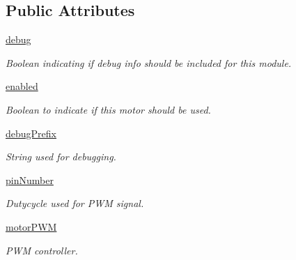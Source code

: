 \subsection*{Public Attributes}
\begin{DoxyCompactItemize}
\item 
\mbox{\label{classmcs_1_1firmware_1_1Sabertooth2x60_1_1Sabertooth2x60_aafa489f4a434df4df82da0dceeb27b67}} 
\hyperlink{classmcs_1_1firmware_1_1Sabertooth2x60_1_1Sabertooth2x60_aafa489f4a434df4df82da0dceeb27b67}{debug}
\begin{DoxyCompactList}\small\item\em Boolean indicating if debug info should be included for this module. \end{DoxyCompactList}\item 
\hyperlink{classmcs_1_1firmware_1_1Sabertooth2x60_1_1Sabertooth2x60_ae169afef04fd25a94334484ea5c3f4a4}{enabled}
\begin{DoxyCompactList}\small\item\em Boolean to indicate if this motor should be used. \end{DoxyCompactList}\item 
\mbox{\label{classmcs_1_1firmware_1_1Sabertooth2x60_1_1Sabertooth2x60_a62b0e670839f1762b117a52560b1c55e}} 
\hyperlink{classmcs_1_1firmware_1_1Sabertooth2x60_1_1Sabertooth2x60_a62b0e670839f1762b117a52560b1c55e}{debug\+Prefix}
\begin{DoxyCompactList}\small\item\em String used for debugging. \end{DoxyCompactList}\item 
\hyperlink{classmcs_1_1firmware_1_1Sabertooth2x60_1_1Sabertooth2x60_a7ecd96fe9fd037dd332643107aa3ea8b}{pin\+Number}
\begin{DoxyCompactList}\small\item\em Dutycycle used for P\+WM signal. \end{DoxyCompactList}\item 
\mbox{\label{classmcs_1_1firmware_1_1Sabertooth2x60_1_1Sabertooth2x60_aca79ca7a5b8a018bb0ac9401d4179fba}} 
\hyperlink{classmcs_1_1firmware_1_1Sabertooth2x60_1_1Sabertooth2x60_aca79ca7a5b8a018bb0ac9401d4179fba}{motor\+P\+WM}
\begin{DoxyCompactList}\small\item\em P\+WM controller. \end{DoxyCompactList}\end{DoxyCompactItemize}


